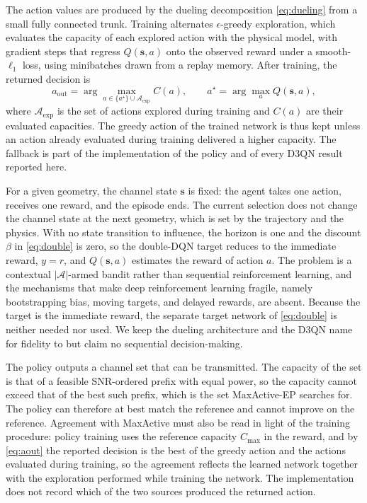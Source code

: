 \documentclass{ieee-ojvt}
\begin{document}
The action values are produced by the dueling decomposition \eqref{eq:dueling} from a
small fully connected trunk. Training alternates $\epsilon$-greedy exploration, which
evaluates the capacity of each explored action with the physical model, with gradient
steps that regress $Q(\mathbf{s},a)$ onto the observed reward under a smooth-$\ell_1$
loss, using minibatches drawn from a replay memory. After training, the returned decision
is
\begin{equation}
a_{\text{out}}=\arg\max_{a\in\{a^{\star}\}\cup\mathcal{A}_{\text{exp}}} C(a),
\qquad a^{\star}=\arg\max_{a}Q(\mathbf{s},a),
\label{eq:aout}
\end{equation}
where $\mathcal{A}_{\text{exp}}$ is the set of actions explored during training and $C(a)$
are their evaluated capacities. The greedy action of the trained network is thus kept
unless an action already evaluated during training delivered a higher capacity. The
fallback is part of the implementation of the policy and of every D3QN result reported
here.

For a given geometry, the channel state $\mathbf{s}$ is fixed: the agent takes one
action, receives one reward, and the episode ends. The current selection does not change
the channel state at the next geometry, which is set by the trajectory and the physics.
With no state transition to influence, the horizon is one and the discount $\beta$ in
\eqref{eq:double} is zero, so the double-DQN target reduces to the immediate reward,
$y=r$, and $Q(\mathbf{s},a)$ estimates the reward of action $a$. The problem is a
contextual $|\mathcal{A}|$-armed bandit \cite{langford2007epoch} rather than sequential
reinforcement learning, and the mechanisms that make deep reinforcement learning fragile,
namely bootstrapping bias, moving targets, and delayed rewards, are absent. Because the
target is the immediate reward, the separate target network of \eqref{eq:double} is
neither needed nor used. We keep the dueling architecture and the D3QN name for fidelity
to \cite{elcik2025d3qn,wang2016dueling} but claim no sequential decision-making.

The policy outputs a channel set that can be transmitted. The capacity of the set is that
of a feasible SNR-ordered prefix with equal power, so the capacity cannot exceed that of
the best such prefix, which is the set MaxActive-EP searches for. The policy can
therefore at best match the reference and cannot improve on the reference. Agreement
with MaxActive must also be read in light of the training procedure: policy training uses
the reference capacity $C_{\max}$ in the reward, and by \eqref{eq:aout} the reported
decision is the best of the greedy action and the actions evaluated during training, so
the agreement reflects the learned network together with the exploration performed while
training the network. The implementation does not record which of the two sources
produced the returned action.
\end{document}
